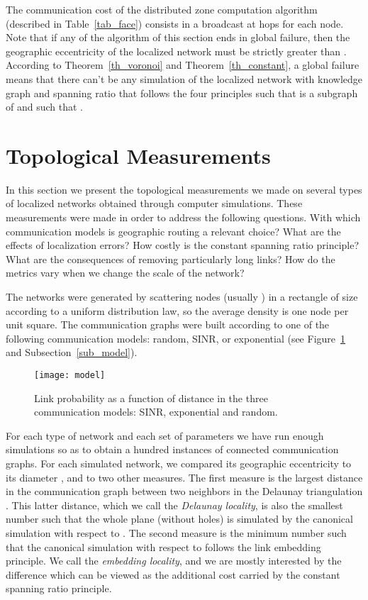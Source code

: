 \documentclass{article}
\begin{document}
The communication cost of the distributed zone computation algorithm (described in Table~\ref{tab_face}) consists in a broadcast at  hops for each node. Note that if any of the algorithm of this section ends in global failure, then the geographic eccentricity of the localized network must be strictly greater than . According to Theorem~\ref{th_voronoi} and Theorem~\ref{th_constant}, a global failure means that there can't be any simulation of the localized network with knowledge graph  and spanning ratio  that follows the four principles such that  is a subgraph of  and such that .

\section{Topological Measurements}
\label{sec_experiment}
In this section we present the topological measurements we made on several types of localized networks obtained through computer simulations.
These measurements were made in order to address the following questions.
With which communication models is geographic routing a relevant choice?
What are the effects of localization errors?
How costly is the constant spanning ratio principle? What are the consequences of removing particularly long links?
How do the metrics vary when we change the scale of the network?

The networks were generated by scattering  nodes (usually ) in a rectangle of size  according to a uniform distribution law, so the average density is one node per unit square. The communication graphs were built according to one of the following communication models: random, SINR, or exponential (see Figure~\ref{fig_model} and Subsection~\ref{sub_model}).
\begin{figure}[h]
\begin{center}
\texttt{[image: model]}
\caption{Link probability as a function of distance in the three communication models: SINR, exponential and random.}
\label{fig_model}
\end{center}
\end{figure}

For each type of network and each set of parameters we have run enough simulations so as to obtain a hundred instances of connected communication graphs. For each simulated network, we compared its geographic eccentricity  to its diameter , and to two other measures. The first measure is the largest distance  in the communication graph  between two neighbors in the Delaunay triangulation . This latter distance, which we call the {\em Delaunay locality}, is also the smallest number such that the whole plane (without holes) is simulated by the canonical simulation with respect to . The second measure is the minimum number  such that the canonical simulation with respect to  follows the link embedding principle. We call  the {\em embedding locality}, and we are mostly interested by the difference  which can be viewed as the additional cost carried by the constant spanning ratio principle. 
\end{document}
